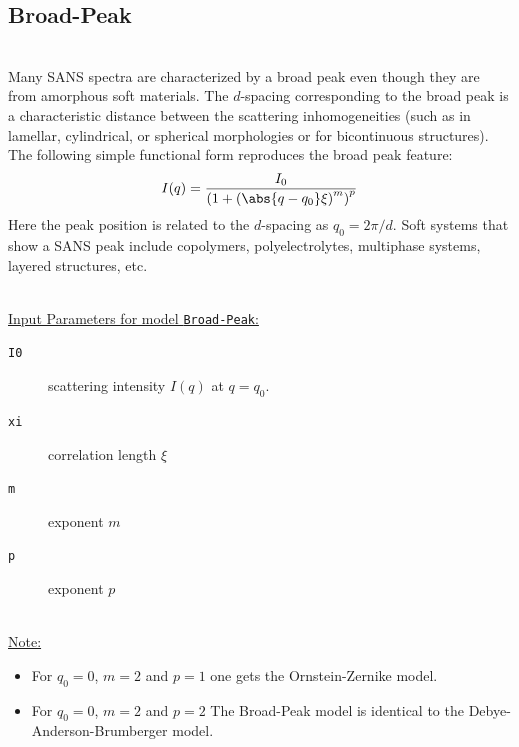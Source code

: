 \subsection{Broad-Peak}
\label{sect:BroadPeak}
 ~\\
Many SANS spectra are characterized by a broad peak even though they
are from amorphous soft materials. The $d$-spacing corresponding to
the broad peak is a characteristic distance between the scattering
inhomogeneities (such as in lamellar, cylindrical, or spherical
morphologies or for bicontinuous structures). The following simple
functional form reproduces the broad peak feature:
\begin{align}
I(q) = \frac{I_0}{\left(1+\left(\abs{q-q_0}\xi\right)^m\right)^p}
\end{align}
Here the peak position is related to the $d$-spacing as $q_0 =
2\pi/d$. Soft systems that show a SANS peak include copolymers,
polyelectrolytes, multiphase systems, layered structures, etc.

\hspace{1pt}\\
\uline{Input Parameters for model \texttt{Broad-Peak}:}\\
\begin{description}
\item[\texttt{I0}] scattering intensity $I(q)$ at $q=q_0$.
\item[\texttt{xi}] correlation length $\xi$
\item[\texttt{m}] exponent $m$
\item[\texttt{p}] exponent $p$
\end{description}

\hspace{1pt}\\
\uline{Note:}
\begin{itemize}
\item For $q_0=0$, $m=2$ and $p=1$ one gets the Ornstein-Zernike model.
\item For $q_0=0$, $m=2$ and $p=2$ The Broad-Peak model is identical to the Debye-Anderson-Brumberger model.
\end{itemize}

